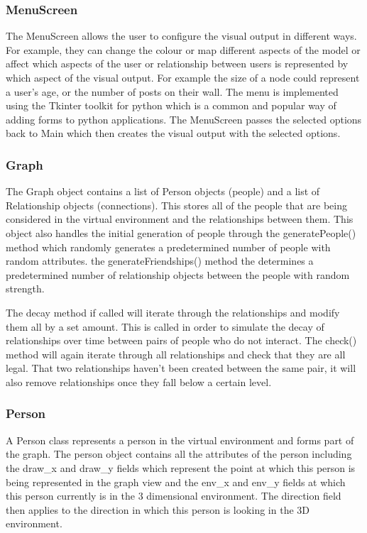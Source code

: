 \documentclass[12pt,a4paper]{article}
\begin{document}
\subsubsection{MenuScreen}
The MenuScreen allows the user to configure the visual output in different ways. For example, they can change the colour or map different aspects of the model or affect which aspects of the user or relationship between users is represented by which aspect of the visual output. For example the size of a node could represent a user's age, or the number of posts on their wall. The menu is implemented using the Tkinter toolkit for python which is a common and popular way of adding forms to python applications. The MenuScreen passes the selected options back to Main which then creates the visual output with the selected options.

\subsubsection{Graph}
The Graph object contains a list of Person objects (people) and a list of Relationship objects (connections). This stores all of the people that are being considered in the virtual environment and the relationships between them. This object also handles the initial generation of people through the generatePeople() method which randomly generates a predetermined number of people with random attributes. the generateFriendships() method the determines a predetermined number of relationship objects between the people with random strength.

The decay method if called will iterate through the relationships and modify them all by a set amount. This is called in order to simulate the decay of relationships over time between pairs of people who do not interact. The check() method will again iterate through all relationships and check that they are all legal. That two relationships haven't been created between the same pair, it will also remove relationships once they fall below a certain level.

\subsubsection{Person}
A Person class represents a person in the virtual environment and forms part of the graph. The person object contains all the attributes of the person including the draw\_x and draw\_y fields which represent the point at which this person is being represented in the graph view and the env\_x and env\_y fields at which this person currently is in the 3 dimensional environment. The direction field then applies to the direction in which this person is looking in the 3D environment.
\end{document}
